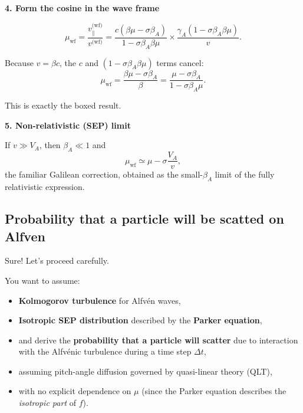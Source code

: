 \begin{tcolorbox}[colback=white, colframe=black, title={Step-by-Step Derivation of Pitch–Angle Cosine in the Wave Frame}]
\medskip

\textbf{4. Form the cosine in the wave frame}

\[
\mu_{\text{wf}}
= \frac{v_\parallel^{\text{(wf)}}}{v^{\text{(wf)}}}
= \frac{c(\beta \mu - \sigma \beta_A)}{1 - \sigma \beta_A \beta \mu}
\times
\frac{\gamma_A (1 - \sigma \beta_A \beta \mu)}{v}.
\]

Because $v = \beta c$, the $c$ and $(1 - \sigma \beta_A \beta \mu)$ terms cancel:
\begin{equation}
\mu_{\text{wf}}
= \frac{\beta \mu - \sigma \beta_A}{\beta}
= \frac{\mu - \sigma \beta_A}{1 - \sigma \beta_A \mu}.
\tag{4}
\end{equation}

This is exactly the boxed result.

\medskip

\textbf{5. Non-relativistic (SEP) limit}

If $v \gg V_A$, then $\beta_A \ll 1$ and
\[
\mu_{\text{wf}} \simeq \mu - \sigma \frac{V_A}{v},
\]
the familiar Galilean correction, obtained as the small-$\beta_A$ limit of the fully relativistic expression.



\end{tcolorbox}

\newpage

\subsection{Probability that a particle will be scatted on Alfven}

Sure! Let’s proceed carefully.

You want to assume:
\begin{itemize}
    \item \textbf{Kolmogorov turbulence} for Alfvén waves,
    \item \textbf{Isotropic SEP distribution} described by the \textbf{Parker equation},
    \item and derive the \textbf{probability that a particle will scatter} due to interaction with the Alfvénic turbulence during a time step $\Delta t$,
    \item assuming pitch-angle diffusion governed by quasi-linear theory (QLT),
    \item with no explicit dependence on $\mu$ (since the Parker equation describes the \emph{isotropic part} of $f$).
\end{itemize}

\hrulefill

